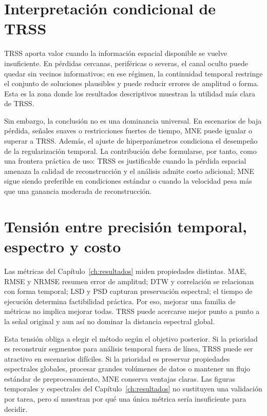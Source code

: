 \section{Interpretación condicional de TRSS}

TRSS aporta valor cuando la información espacial disponible se vuelve insuficiente. En pérdidas cercanas, periféricas o severas, el canal oculto puede quedar sin vecinos informativos; en ese régimen, la continuidad temporal restringe el conjunto de soluciones plausibles y puede reducir errores de amplitud o forma. Esta es la zona donde los resultados descriptivos muestran la utilidad más clara de TRSS.

Sin embargo, la conclusión no es una dominancia universal. En escenarios de baja pérdida, señales suaves o restricciones fuertes de tiempo, MNE puede igualar o superar a TRSS. Además, el ajuste de hiperparámetros condiciona el desempeño de la regularización temporal. La contribución debe formularse, por tanto, como una frontera práctica de uso: TRSS es justificable cuando la pérdida espacial amenaza la calidad de reconstrucción y el análisis admite costo adicional; MNE sigue siendo preferible en condiciones estándar o cuando la velocidad pesa más que una ganancia moderada de reconstrucción.

\section{Tensión entre precisión temporal, espectro y costo}

Las métricas del Capítulo~\ref{ch:resultados} miden propiedades distintas. MAE, RMSE y NRMSE resumen error de amplitud; DTW y correlación se relacionan con forma temporal; LSD y PSD capturan preservación espectral; el tiempo de ejecución determina factibilidad práctica. Por eso, mejorar una familia de métricas no implica mejorar todas. TRSS puede acercarse mejor punto a punto a la señal original y aun así no dominar la distancia espectral global.

Esta tensión obliga a elegir el método según el objetivo posterior. Si la prioridad es reconstruir segmentos para análisis temporal fuera de línea, TRSS puede ser atractivo en escenarios difíciles. Si la prioridad es preservar propiedades espectrales globales, procesar grandes volúmenes de datos o mantener un flujo estándar de preprocesamiento, MNE conserva ventajas claras. Las figuras temporales y espectrales del Capítulo~\ref{ch:resultados} no sustituyen una validación por tarea, pero sí muestran por qué una única métrica sería insuficiente para decidir.

